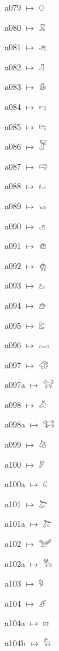 {\noindent a079 $\mapsto$ {\ahfont 𔑘}\par
\noindent a080 $\mapsto$ {\ahfont 𔑙}\par
\noindent a081 $\mapsto$ {\ahfont 𔑚}\par
\noindent a082 $\mapsto$ {\ahfont 𔑛}\par
\noindent a083 $\mapsto$ {\ahfont 𔑜}\par
\noindent a084 $\mapsto$ {\ahfont 𔑝}\par
\noindent a085 $\mapsto$ {\ahfont 𔑞}\par
\noindent a086 $\mapsto$ {\ahfont 𔑟}\par
\noindent a087 $\mapsto$ {\ahfont 𔑠}\par
\noindent a088 $\mapsto$ {\ahfont 𔑡}\par
\noindent a089 $\mapsto$ {\ahfont 𔑢}\par
\noindent a090 $\mapsto$ {\ahfont 𔑣}\par
\noindent a091 $\mapsto$ {\ahfont 𔑤}\par
\noindent a092 $\mapsto$ {\ahfont 𔑥}\par
\noindent a093 $\mapsto$ {\ahfont 𔑦}\par
\noindent a094 $\mapsto$ {\ahfont 𔑧}\par
\noindent a095 $\mapsto$ {\ahfont 𔑨}\par
\noindent a096 $\mapsto$ {\ahfont 𔑩}\par
\noindent a097 $\mapsto$ {\ahfont 𔑪}\par
\noindent a097a $\mapsto$ {\ahfont 𔑫}\par
\noindent a098 $\mapsto$ {\ahfont 𔑬}\par
\noindent a098a $\mapsto$ {\ahfont 𔑭}\par
\noindent a099 $\mapsto$ {\ahfont 𔑮}\par
\noindent a100 $\mapsto$ {\ahfont 𔑯}\par
\noindent a100a $\mapsto$ {\ahfont 𔑰}\par
\noindent a101 $\mapsto$ {\ahfont 𔑱}\par
\noindent a101a $\mapsto$ {\ahfont 𔑲}\par
\noindent a102 $\mapsto$ {\ahfont 𔑳}\par
\noindent a102a $\mapsto$ {\ahfont 𔑴}\par
\noindent a103 $\mapsto$ {\ahfont 𔑵}\par
\noindent a104 $\mapsto$ {\ahfont 𔑶}\par
\noindent a104a $\mapsto$ {\ahfont 𔑷}\par
\noindent a104b $\mapsto$ {\ahfont 𔑸}\par
}
